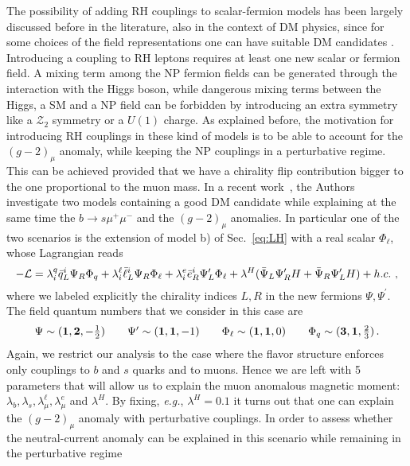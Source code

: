 \documentclass[a4paper,11pt]{article}
\begin{document}
The possibility of adding RH couplings to scalar-fermion models has been largely  discussed before in the literature, also in the context of DM physics, since for some choices of the field representations one can have suitable DM candidates \cite{Kowalska:2017iqv,Calibbi:2018rzv,Crivellin:2018qmi,Arnan:2019uhr,Arcadi:2021cwg}. 
Introducing a coupling to RH leptons requires at least one new scalar or fermion field. A mixing term among the NP fermion fields can be generated through the interaction with the Higgs boson, while dangerous mixing terms between the Higgs, a SM and a NP field can be forbidden by introducing an extra symmetry like a $\mathcal{Z}_2$ symmetry or a $U(1)$ charge. As explained before, the motivation for introducing RH couplings in these kind of models is to be able to account for the $(g-2)_\mu$ anomaly, while keeping the NP couplings in a perturbative regime. This can be achieved provided that we have a chirality flip contribution bigger to the one proportional to the muon mass.
In a recent work~\cite{Arcadi:2021cwg}, the Authors investigate two models containing a good DM candidate while explaining at the same time the  $b\to s \mu^+ \mu^-$ and the $(g-2)_\mu$ anomalies. In particular one of the two scenarios 
is the extension of model b) of Sec.~\ref{eq:LH} with a real scalar $\Phi_\ell$, whose Lagrangian reads
\begin{equation}
-{\cal L} =  {\lambda^q_i\bar q_L^i  }{\Psi_R}{\Phi_q} + \lambda^\ell_i \bar \ell_L^i  {\Psi_R}{\Phi_\ell} + \lambda^e_i \bar e_R^i {\Psi_L^\prime}{\Phi_\ell} +\lambda^H( \bar \Psi_L{\Psi_R^\prime }{H} + \bar \Psi_R{\Psi_L ^\prime}{H}) + h.c. \ ,
\label{eq:LintbRH}
\end{equation}
where we labeled explicitly the chirality indices $L,R$  in the new fermions $\Psi, \Psi^\prime$. The field quantum numbers that we consider in this case are
\begin{equation}
\begin{array}{ccccc}
\Psi\sim ({\bf 1},{\bf 2},-\frac{1}{2})~~~& \Psi^\prime\sim ({\bf 1},{\bf 1},-1)~~~&\Phi_\ell \sim ({\bf 1},{\bf 1},0)~~~&\Phi_q \sim ({\bf 3},{\bf 1},\frac{2}{3}) \,.
\end{array}
\end{equation}
Again, we restrict our analysis to the case where the flavor structure enforces only couplings to $b$ and $s$ quarks and to muons. Hence we are left with 5 parameters
that will allow us to explain the muon anomalous magnetic moment: $\lambda_b,\lambda_s,\lambda^\ell_\mu,\lambda^e_\mu$ and $\lambda^H$. By fixing, {\emph{e.g.}}, $\lambda^H=0.1$ it turns out that one can explain the $(g-2)_\mu$ anomaly with perturbative couplings. In order to assess whether the neutral-current anomaly can be explained in this scenario while remaining in the perturbative regime
\end{document}
